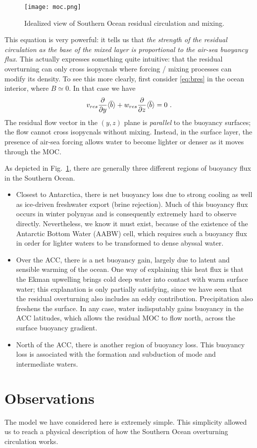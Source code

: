 \documentclass[12pt]{article}
\newcommand{\pd}[2]{ \frac{\partial #1}{\partial #2} }
\newcommand{\ab}[1]{\ensuremath{\langle #1 \rangle}}
\newcommand{\ol}{\ensuremath{\overline}}
\begin{document}
\begin{figure}[htbp]
\begin{center}
\texttt{[image: moc.png]}
\caption{Idealized view of Southern Ocean residual circulation and mixing.}
\label{fig:cartoon_side}
\end{center}
\end{figure}

This equation is very powerful: it tells us that {\em the strength of the residual circulation as the base of the mixed layer is proportional to the air-sea buoyancy flux}. This actually expresses something quite intuitive: that the residual overturning can only cross isopycnals where forcing / mixing processes can modify its density. To see this more clearly, first consider \eqref{eq:bres} in the ocean interior, where $B \simeq 0$. In that case we have
\begin{equation}
v_{res} \pd{}{y} \ab{\ol{b}} + w_{res} \pd{}{z} \ab{\ol{b}} = 0 \ .
\end{equation}
The residual flow vector in the $(y, z)$ plane is {\em parallel} to the buoyancy surfaces; the flow cannot cross isopycnals without mixing. Instead, in the surface layer, the presence of air-sea forcing allows water to become lighter or denser as it moves through the MOC.

As depicted in Fig.~\ref{fig:cartoon_side}, there are generally three different regions of buoyancy flux in the Southern Ocean.
\begin{itemize}
\item Closest to Antarctica, there is net buoyancy loss due to strong cooling as well as ice-driven freshwater export (brine rejection). Much of this buoyancy flux occurs in winter polynyas and is consequently extremely hard to observe directly. Nevertheless, we know it must exist, because of the existence of the Antarctic Bottom Water (AABW) cell, which requires such a buoyancy flux in order for lighter waters to be transformed to dense abyssal water.
\item Over the ACC, there is a net buoyancy gain, largely due to latent and sensible warming of the ocean. One way of explaining this heat flux is that the Ekman upwelling brings cold deep water into contact with warm surface water; this explanation is only partially satisfying, since we have seen that the residual overturning also includes an eddy contribution. Precipitation also freshens the surface. In any case, water indisputably gains buoyancy in the ACC latitudes, which allows the residual MOC to flow north, across the surface buoyancy gradient.
\item North of the ACC, there is another region of buoyancy loss. This buoyancy loss is associated with the formation and subduction of mode and intermediate waters.
\end{itemize}

\section{Observations}

The model we have considered here is extremely simple. This simplicity allowed us to reach a physical description of how the Southern Ocean overturning circulation works. 





\end{document}
